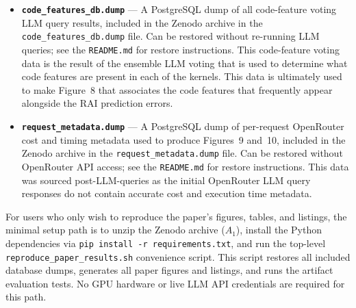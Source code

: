 \begin{itemize}
    \item \textbf{\texttt{code\_features\_db.dump}} --- A PostgreSQL dump of all code-feature voting LLM query results, included in the Zenodo archive in the \texttt{code\_features\_db.dump} file.
    Can be restored without re-running LLM queries; see the \texttt{README.md} for restore instructions.
    This code-feature voting data is the result of the ensemble LLM voting that is used to determine what code features are present in each of the kernels.
    This data is ultimately used to make Figure~8 that associates the code features that frequently appear alongside the RAI prediction errors.

    \item \textbf{\texttt{request\_metadata.dump}} --- A PostgreSQL dump of per-request OpenRouter cost and timing metadata used to produce Figures~9 and~10, included in the Zenodo archive in the  \texttt{request\_metadata.dump} file.
    Can be restored without OpenRouter API access; see the \texttt{README.md} for restore instructions.
    This data was sourced post-LLM-queries as the initial OpenRouter LLM query responses do not contain accurate cost and execution time metadata.
\end{itemize}















For users who only wish to reproduce the paper's figures, tables, and listings, the minimal setup path is to unzip the Zenodo archive ($A_1$), install the Python dependencies via \texttt{pip install -r requirements.txt}, and run the top-level \texttt{reproduce\_paper\_results.sh} convenience script.
This script restores all included database dumps, generates all paper figures and listings, and runs the artifact evaluation tests.
No GPU hardware or live LLM API credentials are required for this path.

